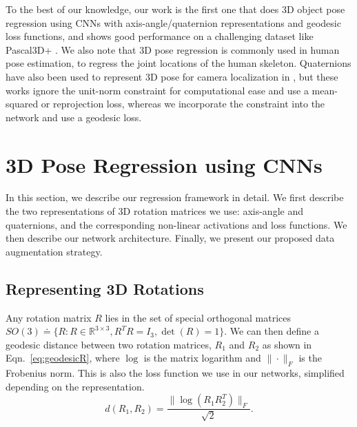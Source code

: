 \documentclass[10pt,twocolumn,letterpaper]{article}
\begin{document}
	To the best of our knowledge, our work is the first one that does 3D object pose regression using CNNs with axis-angle/quaternion representations and geodesic loss functions, and shows good performance on a challenging dataset like Pascal3D+ \cite{Xiang:WACV14}. We also note that 3D pose regression is commonly used in human pose estimation, to regress the joint locations of the human skeleton. Quaternions have also been used to represent 3D pose for camera localization in \cite{Kendall:ICCV15, Kendall:CVPR17, Kendall:ICRA16}, but these works ignore the unit-norm constraint for computational ease and use a mean-squared or reprojection loss, whereas we incorporate the constraint into the network and use a geodesic loss.
	
	\section{3D Pose Regression using CNNs}
	\label{sec:model}
	In this section, we describe our regression framework in detail. We first describe the two 
	representations of 3D rotation matrices we use: axis-angle and quaternions, and the 
	corresponding non-linear activations and loss functions. We then describe our network architecture. Finally, we present our proposed data augmentation strategy.
	
	\subsection{Representing 3D Rotations}
	\label{sec:representation}
	Any rotation matrix $R$ lies in the set of special orthogonal matrices $SO(3) \doteq \{ R: R 
	\in \mathbb{R}^{3 \times 3}, R^T R = I_3, \det(R) = 1 \}$. We can then define a geodesic 
	distance between two rotation matrices, $R_1$ and $R_2$ as shown in Eqn.~\eqref{eq:geodesicR}, where $\log$ is the matrix logarithm and $\|\cdot\|_F$ is the Frobenius norm. This is also the loss function we use in our networks, simplified depending on the representation. 
	\begin{equation}
	d(R_1, R_2) = \frac{\|\log(R_1 R_2^T) \|_F}{\sqrt{2}} .
	\label{eq:geodesicR}
	\end{equation}
	
\end{document}
